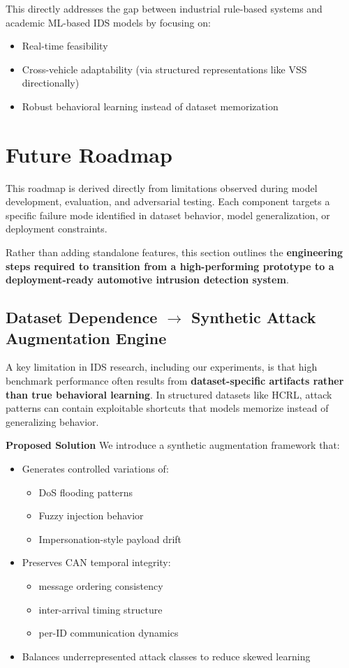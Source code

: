\documentclass{article}
\begin{document}
This directly addresses the gap between industrial rule-based systems and academic ML-based IDS models by focusing on:
\begin{itemize}[noitemsep]
    \item Real-time feasibility
    \item Cross-vehicle adaptability (via structured representations like VSS directionally)
    \item Robust behavioral learning instead of dataset memorization
\end{itemize}

\section{Future Roadmap}
This roadmap is derived directly from limitations observed during model development, evaluation, and adversarial testing. Each component targets a specific failure mode identified in dataset behavior, model generalization, or deployment constraints.

Rather than adding standalone features, this section outlines the \textbf{engineering steps required to transition from a high-performing prototype to a deployment-ready automotive intrusion detection system}.

\subsection{Dataset Dependence $\rightarrow$ Synthetic Attack Augmentation Engine}
A key limitation in IDS research, including our experiments, is that high benchmark performance often results from \textbf{dataset-specific artifacts rather than true behavioral learning}. In structured datasets like HCRL, attack patterns can contain exploitable shortcuts that models memorize instead of generalizing behavior.

\textbf{Proposed Solution}
We introduce a synthetic augmentation framework that:
\begin{itemize}[noitemsep]
    \item Generates controlled variations of:
    \begin{itemize}[noitemsep]
        \item DoS flooding patterns
        \item Fuzzy injection behavior
        \item Impersonation-style payload drift
    \end{itemize}
    \item Preserves CAN temporal integrity:
    \begin{itemize}[noitemsep]
        \item message ordering consistency
        \item inter-arrival timing structure
        \item per-ID communication dynamics
    \end{itemize}
    \item Balances underrepresented attack classes to reduce skewed learning
\end{itemize}
\end{document}
